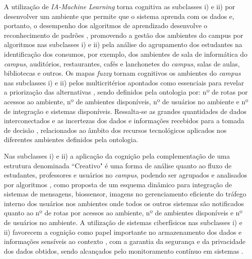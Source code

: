 \documentclass[portuguese]{textolivre}
\begin{document}
A utilização de \textit{IA-Machine Learning} torna cognitiva as subclasses i) e ii) por desenvolver um ambiente que permite que o sistema aprenda com os dados e, portanto, o desempenho dos algoritmos de aprendizado desenvolve o reconhecimento de padrões \cite{sangwan2021}, promovendo a gestão dos ambientes do campus por algoritmos \cite{wang2023} nas subclasses i) e ii) pela análise do agrupamento dos estudantes na identificação dos consumos, por exemplo, dos ambientes de sala de informática do \textit{campus}, auditórios, restaurantes, cafés e lanchonetes do \textit{campus}, salas de aulas, bibliotecas e outros. Os mapas \textit{fuzzy} tornam cognitivos os ambientes do \textit{campus} nas subclasses i) e ii) pelos multicritérios apontados como essenciais para revelar a priorização das alternativas \cite{karasan2021}, sendo definidos pela ontologia por: nº de rotas por acessos ao ambiente, nº de ambientes disponíveis, nº de usuários no ambiente e nº de integração e sistemas disponíveis. Ressalta-se as grandes quantidades de dados interconectados \cite{donofrio2018} e as incertezas dos dados e informações recebidos \cite{tabacchi2019} para a tomada de decisão \cite{vaz2022}, relacionados ao âmbito dos recursos tecnológicos aplicados nos diferentes ambientes definidos pela ontologia.

Nas subclasses i) e ii) a aplicação da cognição pela complementação de uma estrutura denominada ``Creativo" é uma forma de análise quanto ao fluxo de estudantes, professores e usuários no \textit{campus}, podendo ser agrupados e analisados por algoritmos \cite{wang2023}, como proposta de um esquema dinâmico para integração de sistemas de mensagens, biossensor, imagens \cite{sastry2017} no gerenciamento eficiente do tráfego interno dos usuários nos ambientes onde todos os outros sistemas são notificados \cite{rezaei2021} quanto ao nº de rotas por acessos ao ambiente, nº de ambientes disponíveis e nº de usuários no ambiente. A utilização de sistemas ciberfísicos nas subclasses i) e ii) favorecem a cognição como papel importante no armazenamento dos dados e informações sensíveis ao contexto \cite{rahman2019}, com a garantia da segurança e da privacidade dos dados obtidos, sendo alcançados pelo monitoramento contínuo em sistemas \cite{machin2021}.
\end{document}
